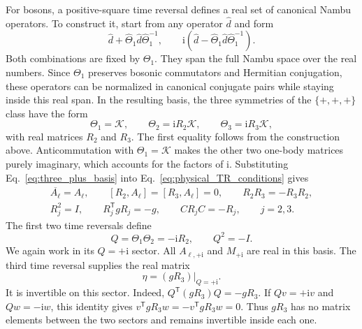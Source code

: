 \documentclass[onecolumn,aps,prb,amsmath,amssymb,superscriptaddress,longbibliography]{revtex4-2}
\newcommand{\ii}{\mathrm{i}}
\newcommand{\trans}{\mathsf{T}}
\newcommand{\mc}[1]{\mathcal{#1}}
\begin{document}
For bosons, a positive-square time reversal defines a real set of canonical Nambu operators.  To construct it, start from any operator \(\hat d\) and form
\begin{equation}
    \hat d+\widehat\Theta_1\hat d\widehat\Theta_1^{-1},
    \qquad
    \ii(\hat d-\widehat\Theta_1\hat d\widehat\Theta_1^{-1}).
    \label{eq:Theta1_real_operators}
\end{equation}
Both combinations are fixed by \(\Theta_1\).  They span the full Nambu space over the real numbers.  Since \(\Theta_1\) preserves bosonic commutators and Hermitian conjugation, these operators can be normalized in canonical conjugate pairs while staying inside this real span.  In the resulting basis, the three symmetries of the \(\{+,+,+\}\) class have the form
\begin{equation}
    \Theta_1=\mc K,
    \qquad
    \Theta_2=\ii R_2\mc K,
    \qquad
    \Theta_3=\ii R_3\mc K,
    \label{eq:three_plus_basis}
\end{equation}
with real matrices \(R_2\) and \(R_3\).  The first equality follows from the construction above.  Anticommutation with \(\Theta_1=\mc K\) makes the other two one-body matrices purely imaginary, which accounts for the factors of \(\ii\).  Substituting Eq.~\eqref{eq:three_plus_basis} into Eq.~\eqref{eq:physical_TR_conditions} gives
\begin{gather}
    \overline{A_\ell}=A_\ell,
    \qquad
    [R_2,A_\ell]=[R_3,A_\ell]=0,
    \qquad
    R_2R_3=-R_3R_2,
    \label{eq:three_plus_A}\\
    R_j^2=I,
    \qquad
    R_j^\trans gR_j=-g,
    \qquad
    CR_jC=-R_j,
    \qquad j=2,3.
    \label{eq:three_plus_physical}
\end{gather}
The first two time reversals define
\begin{equation}
    Q=\Theta_1\Theta_2=-\ii R_2,
    \qquad Q^2=-I.
    \label{eq:three_plus_Q}
\end{equation}
We again work in its \(Q=+\ii\) sector.  All \(A_{\ell,+\ii}\) and \(M_{+\ii}\) are real in this basis.  The third time reversal supplies the real matrix
\begin{equation}
    \eta=(gR_3)\big|_{Q=+\ii}.
    \label{eq:eta_definition}
\end{equation}
It is invertible on this sector.  Indeed, \(Q^\trans(gR_3)Q=-gR_3\).  If \(Qv=+\ii v\) and \(Qw=-\ii w\), this identity gives \(v^\trans gR_3w=-v^\trans gR_3w=0\).  Thus \(gR_3\) has no matrix elements between the two sectors and remains invertible inside each one.
\end{document}
